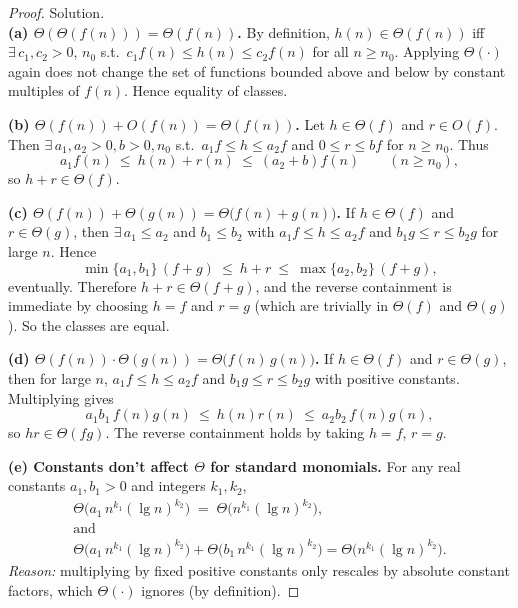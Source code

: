 \documentclass[12pt]{article}
\theoremstyle{definition}
\begin{document}
\begin{proof}
Solution. \\[-0.5ex]

\noindent
\textbf{(a) $\Theta(\Theta(f(n)))=\Theta(f(n))$.}
By definition, $h(n)\in\Theta(f(n))$ iff $\exists\,c_1,c_2>0,\,n_0$ s.t.\ $c_1 f(n)\le h(n)\le c_2 f(n)$ for all $n\ge n_0$.
Applying $\Theta(\cdot)$ again does not change the set of functions bounded above and below by constant multiples of $f(n)$. Hence equality of classes.

\medskip
\noindent
\textbf{(b) $\Theta(f(n)) + O(f(n))=\Theta(f(n))$.}
Let $h\in\Theta(f)$ and $r\in O(f)$. Then $\exists\,a_1,a_2>0, b>0, n_0$ s.t.\
$a_1 f\le h\le a_2 f$ and $0\le r\le b f$ for $n\ge n_0$. Thus
\[
a_1 f(n)\ \le\ h(n)+r(n)\ \le\ (a_2+b) f(n) \qquad (n\ge n_0),
\]
so $h+r\in\Theta(f)$.

\medskip
\noindent
\textbf{(c) $\Theta(f(n))+\Theta(g(n))=\Theta\big(f(n)+g(n)\big)$.}
If $h\in\Theta(f)$ and $r\in\Theta(g)$, then $\exists\,a_1\!\le\!a_2$ and $b_1\!\le\!b_2$ with
$a_1 f\le h\le a_2 f$ and $b_1 g\le r\le b_2 g$ for large $n$. Hence
\[
\min\{a_1,b_1\}\,(f+g)\ \le\ h+r\ \le\ \max\{a_2,b_2\}\,(f+g),
\]
eventually. Therefore $h+r\in\Theta(f+g)$, and the reverse containment is immediate by choosing $h=f$ and $r=g$ (which are trivially in $\Theta(f)$ and $\Theta(g)$). So the classes are equal.

\medskip
\noindent
\textbf{(d) $\Theta(f(n))\cdot\Theta(g(n))=\Theta\big(f(n)\,g(n)\big)$.}
If $h\in\Theta(f)$ and $r\in\Theta(g)$, then for large $n$,
$a_1 f\le h\le a_2 f$ and $b_1 g\le r\le b_2 g$ with positive constants.
Multiplying gives
\[
a_1 b_1\, f(n)g(n)\ \le\ h(n)r(n)\ \le\ a_2 b_2\, f(n)g(n),
\]
so $hr\in\Theta(fg)$. The reverse containment holds by taking $h=f$, $r=g$.

\medskip
\noindent
\textbf{(e) Constants don’t affect $\Theta$ for standard monomials.}
For any real constants $a_1,b_1>0$ and integers $k_1,k_2$,
\[
\begin{aligned}
\Theta\!\big(a_1\,n^{k_1}(\lg n)^{k_2}\big)\;=\;\Theta\!\big(n^{k_1}(\lg n)^{k_2}\big),\\
\text{and}\\
\Theta\!\big(a_1\,n^{k_1}(\lg n)^{k_2}\big)+\Theta\!\big(b_1\,n^{k_1}(\lg n)^{k_2}\big)
=\Theta\!\big(n^{k_1}(\lg n)^{k_2}\big).
\end{aligned}
\]
\emph{Reason:} multiplying by fixed positive constants only rescales by absolute constant factors, which $\Theta(\cdot)$ ignores (by definition).


\end{proof}
\end{document}
